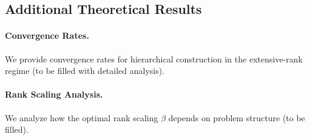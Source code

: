 \subsection{Additional Theoretical Results}

\paragraph{Convergence Rates.}
We provide convergence rates for hierarchical construction in the extensive-rank regime (to be filled with detailed analysis).

\paragraph{Rank Scaling Analysis.}
We analyze how the optimal rank scaling $\beta$ depends on problem structure (to be filled).
